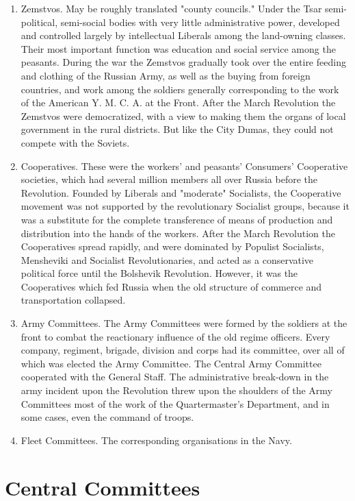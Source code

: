 \begin{enumerate}
\begin{enumerate}
\item Zemstvos. May be roughly translated "county councils." Under the Tsar semi-political, semi-social bodies with very little administrative power, developed and controlled largely by intellectual Liberals among the land-owning classes. Their most important function was education and social service among the peasants. During the war the Zemstvos gradually took over the entire feeding and clothing of the Russian Army, as well as the buying from foreign countries, and work among the soldiers generally corresponding to the work of the American Y. M. C. A. at the Front. After the March Revolution the Zemstvos were democratized, with a view to making them the organs of local government in the rural districts. But like the City Dumas, they could not compete with the Soviets.

\item Cooperatives. These were the workers' and peasants' Consumers' Cooperative societies, which had several million members all over Russia before the Revolution. Founded by Liberals and "moderate" Socialists, the Cooperative movement was not supported by the revolutionary Socialist groups, because it was a substitute for the complete transference of means of production and distribution into the hands of the workers. After the March Revolution the Cooperatives spread rapidly, and were dominated by Populist Socialists, Mensheviki and Socialist Revolutionaries, and acted as a conservative political force until the Bolshevik Revolution. However, it was the Cooperatives which fed Russia when the old structure of commerce and transportation collapsed.

\item Army Committees. The Army Committees were formed by the soldiers at the front to combat the reactionary influence of the old regime officers. Every company, regiment, brigade, division and corps had its committee, over all of which was elected the Army Committee. The Central Army Committee cooperated with the General Staff. The administrative break-down in the army incident upon the Revolution threw upon the shoulders of the Army Committees most of the work of the Quartermaster's Department, and in some cases, even the command of troops.

\item Fleet Committees. The corresponding organisations in the Navy.
\end{enumerate}
\section*{Central Committees}


\end{enumerate}
